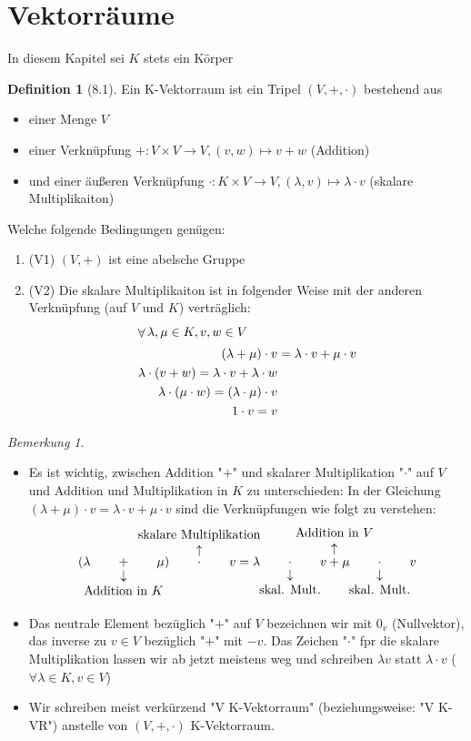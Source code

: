 \documentclass[a4paper]{scrartcl}
\DeclareMathOperator{\Forall}{\forall}
\theoremstyle{definition}
\newtheorem{defn}{Definition}
\theoremstyle{plain}
\theoremstyle{plain}
\theoremstyle{remark}
\newtheorem{remark}{Bemerkung}
\theoremstyle{remark}
\theoremstyle{remark}
\theoremstyle{remark}
\theoremstyle{remark}
\begin{document}
\section{Vektorräume}
\label{sec-5}
In diesem Kapitel sei $K$ stets ein Körper
\begin{defn}[8.1]
Ein K-Vektorraum ist ein Tripel $(V,+,\cdot)$ bestehend aus
\begin{itemize}
\item einer Menge $V$
\item einer Verknüpfung $+:V\times V \to V, (v,w)\mapsto v + w$ \hfill (Addition)
\item und einer äußeren Verknüpfung $\cdot : K\times V \to V, (\lambda,v) \mapsto \lambda \cdot v$ \hfill (skalare Multiplikaiton)
\end{itemize}
Welche folgende Bedingungen genügen:
\begin{enumerate}
\item (V1) $(V,+)$ ist eine abelsche Gruppe
\item (V2) Die skalare Multiplikaiton ist in folgender Weise mit der anderen Verknüpfung (auf $V$ und $K$) verträglich:
\begin{align*}
\intertext{$\Forall \lambda,\mu \in K, v,w\in V$}
(\lambda + \mu) \cdot v  &= \lambda \cdot v + \mu \cdot v \\
\lambda \cdot (v + w) = \lambda \cdot v + \lambda \cdot w \\
\lambda \cdot (\mu \cdot w) = (\lambda \cdot \mu) \cdot v \\
1\cdot v = v
\end{align*}
\end{enumerate}
\end{defn}
\begin{remark}
\begin{itemize}
\item Es ist wichtig, zwischen Addition "$+$" und skalarer Multiplikation "$\cdot$" auf $V$ und Addition und Multiplikation in $K$ zu unterschieden:
In der Gleichung $(\lambda + \mu) \cdot v = \lambda \cdot v + \mu\cdot v$ sind die Verknüpfungen wie folgt zu verstehen:
\[(\lambda \qquad\underarrow[+]{Addition in $K$}\qquad \mu) \qquad \overarrow[\cdot]{skalare Multiplikation} \qquad v = \lambda \qquad \underarrow[\cdot]{skal. Mult.} \qquad v \overarrow[+]{Addition in $V$} \mu\qquad\underarrow[\cdot]{skal. Mult.} \qquad v\]
\item Das neutrale Element bezüglich "$+$" auf $V$ bezeichnen wir mit $0_v$ (Nullvektor), das inverse zu $v\in V$ bezüglich "$+$" mit $-v$. Das Zeichen "$\cdot$" fpr die skalare Multiplikation lassen wir ab jetzt meistens weg und schreiben $\lambda v$ statt $\lambda\cdot v$ ($\Forall \lambda\in K, v\in V$)
\item Wir schreiben meist verkürzend "V K-Vektorraum" (beziehungsweise: "V K-VR") anstelle von $(V,+,\cdot)$ K-Vektorraum.
\end{itemize}
\end{remark}
\end{document}
